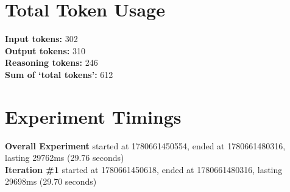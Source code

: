 \documentclass{article}
\begin{document}
\section*{Total Token Usage}
\textbf{Input tokens: }302
\\\textbf{Output tokens: }310
\\\textbf{Reasoning tokens: }246
\\\textbf{Sum of `total tokens': }612
\section*{Experiment Timings}
\textbf{Overall Experiment} started at 1780661450554, ended at 1780661480316, lasting 29762ms (29.76 seconds)
\\\textbf{Iteration \#1} started at 1780661450618, ended at 1780661480316, lasting 29698ms (29.70 seconds)
\end{document}
